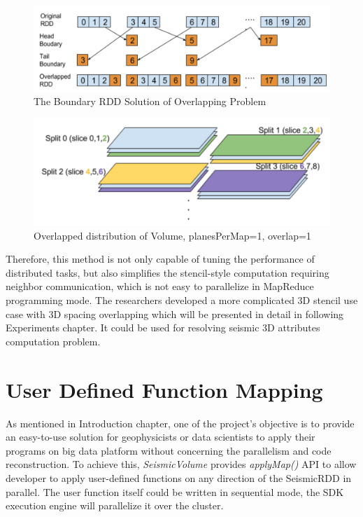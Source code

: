 \begin{figure}[h]
\centering
\includegraphics[scale=0.5]{figures/boundaryRDD.png}
\caption{The Boundary RDD Solution of Overlapping Problem}
\label{boundaryRDD}
\end{figure}

\begin{figure}[h]
\centering
\includegraphics[scale=0.5]{figures/Overlap.png}
\caption{Overlapped distribution of Volume, planesPerMap=1, overlap=1}
\label{Overlap}
\end{figure}

Therefore, this method is not only capable of tuning the performance of distributed tasks, but also simplifies the stencil-style computation requiring neighbor communication, which is not easy to parallelize in MapReduce programming mode. The researchers developed a more complicated 3D stencil use case with 3D spacing overlapping which will be presented in detail in following Experiments chapter. It could be used for resolving seismic 3D attributes computation problem.


\section{User Defined Function Mapping}

As mentioned in Introduction chapter, one of the project's objective is to provide an easy-to-use solution for geophysicists or data scientists to apply their programs on big data platform without concerning the parallelism and code reconstruction. To achieve this, \emph{SeismicVolume} provides \emph{applyMap()} API to allow developer to apply user-defined functions on any direction of the SeismicRDD in parallel. The user function itself could be written in sequential mode, the SDK execution engine will parallelize it over the cluster.

